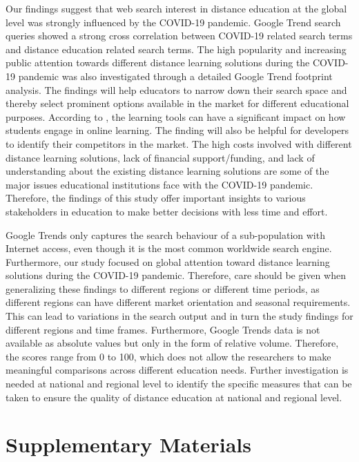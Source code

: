 \documentclass[11pt,a4paper,]{article}
\begin{document}
Our findings suggest that web search interest in distance education at the global level was strongly influenced by the COVID-19 pandemic. Google Trend search queries showed a strong cross correlation between COVID-19 related search terms and distance education related search terms. The high popularity and increasing public attention towards different distance learning solutions during the COVID-19 pandemic was also investigated through a detailed Google Trend footprint analysis. The findings will help educators to narrow down their search space and thereby select prominent options available in the market for different educational purposes. According to \textcite{wallace2003online}, the learning tools can have a significant impact on how students engage in online learning. The finding will also be helpful for developers to identify their competitors in the market. The high costs involved with different distance learning solutions, lack of financial support/funding, and lack of understanding about the existing distance learning solutions are some of the major issues educational institutions face with the COVID-19 pandemic. Therefore, the findings of this study offer important insights to various stakeholders in education to make better decisions with less time and effort.

Google Trends only captures the search behaviour of a sub-population with Internet access, even though it is the most common worldwide search engine. Furthermore, our study focused on global attention toward distance learning solutions during the COVID-19 pandemic. Therefore, care should be given when generalizing these findings to different regions or different time periods, as different regions can have different market orientation and seasonal requirements. This can lead to variations in the search output and in turn the study findings for different regions and time frames. Furthermore, Google Trends data is not available as absolute values but only in the form of relative volume. Therefore, the scores range from 0 to 100, which does not allow the researchers to make meaningful comparisons across different education needs. Further investigation is needed at national and regional level to identify the specific measures that can be taken to ensure the quality of distance education at national and regional level.

\hypertarget{supplementary-materials}{%
\section*{Supplementary Materials}\label{supplementary-materials}}
\end{document}
